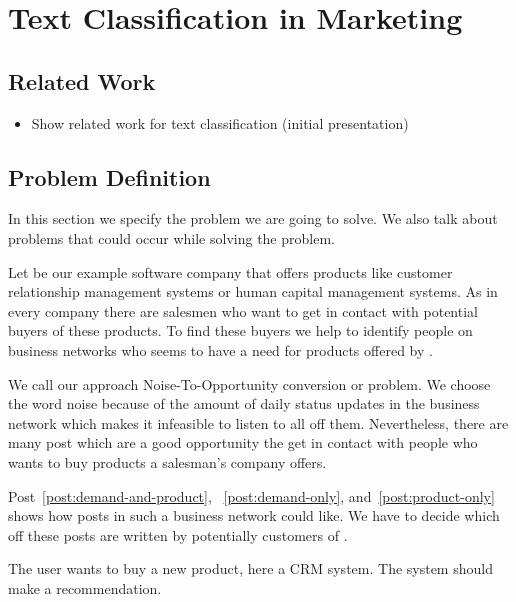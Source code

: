 
\section{Text Classification in Marketing}
\label{sec:background}

\subsection{Related Work}

\begin{itemize}
	\item Show related work for text classification (initial presentation)
\end{itemize}

\subsection{Problem Definition}
\label{sec:background-problem}

In this section we specify the problem we are going to solve. We also talk about problems that could occur while solving the problem. 

Let \acme be our example software company that offers products like customer relationship management systems or human capital management systems. 
As in every company there are salesmen who want to get in contact with potential buyers of these products. 
To find these buyers we help \acme to identify people on business networks who seems to have a need for products offered by \acme.

We call our approach Noise-To-Opportunity conversion or \nto problem.
We choose the word noise because of the amount of daily status updates in the business network which makes it infeasible to listen to all off them.
Nevertheless, there are many post which are a good opportunity the get in contact with people who wants to buy products a salesman's company offers. 

Post~\ref{post:demand-and-product}, ~\ref{post:demand-only}, and~\ref{post:product-only} shows how posts in such a business network could like. 
We have to decide which off these posts are written by potentially customers of \acme. 

\begin{post}
	\centering
	\caption{The user wants to buy a new product, here a CRM system. The system should make a recommendation.}
	\label{post:demand-and-product}
\end{post}

